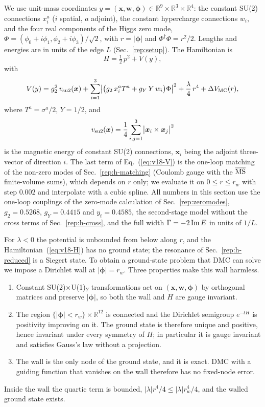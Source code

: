 We use unit-mass coordinates $y=(\bm x,\bm w,\bm\phi)\in\mathbb R^9\times\mathbb R^3\times\mathbb R^4$: the constant SU(2) connections $x_i^a$ ($i$ spatial, $a$ adjoint), the constant hypercharge connections $w_i$, and the four real components of the Higgs zero mode, $\Phi=(\phi_0+i\phi_1,\phi_2+i\phi_3)/\sqrt2$, with $r=|\bm\phi|$ and $\Phi^\dagger\Phi=r^2/2$.
Lengths and energies are in units of the edge $L$ (Sec.~\ref{rep:setup}).
The Hamiltonian is
\begin{equation}
H=\tfrac12\,p^2+V(y),
\label{eq:v18-H}
\end{equation}
with
\begin{equation}
V(y)=g_2^2\,v_{\rm su2}(\bm x)+\sum_{i=1}^3\bigl|\bigl(g_2\,x_i^aT^a+g_Y\,Y\,w_i\bigr)\Phi\bigr|^2+\frac{\lambda}{4}\,r^4+\Delta V_{\rm MC}(r),
\label{eq:v18-V}
\end{equation}
where $T^a=\sigma^a/2$, $Y=1/2$, and
\begin{equation}
v_{\rm su2}(\bm x)=\frac14\sum_{i,j=1}^{3}\bigl|\bm x_i\times\bm x_j\bigr|^2
\label{eq:v18-vsu2}
\end{equation}
is the magnetic energy of constant SU(2) connections, $\bm x_i$ being the adjoint three-vector of direction $i$.
The last term of Eq.~(\ref{eq:v18-V}) is the one-loop matching of the non-zero modes of Sec.~\ref{rep:h-matching} (Coulomb gauge with the $\overline{\mathrm{MS}}$ finite-volume sums), which depends on $r$ only; we evaluate it on $0\le r\le r_w$ with step $0.002$ and interpolate with a cubic spline.
All numbers in this section use the one-loop couplings of the zero-mode calculation of Sec.~\ref{rep:zeromodes}, $g_2=0.5268$, $g_Y=0.4415$ and $y_t=0.4585$, the second-stage model without the cross terms of Sec.~\ref{rep:h-cross}, and the full width $\Gamma=-2\,{\rm Im}\,E$ in units of $1/L$. %

For $\lambda<0$ the potential is unbounded from below along $r$, and the Hamiltonian~(\ref{eq:v18-H}) has no ground state; the resonance of Sec.~\ref{rep:h-reduced} is a Siegert state.
To obtain a ground-state problem that DMC can solve we impose a Dirichlet wall at $|\bm\phi|=r_w$.
Three properties make this wall harmless.
\begin{enumerate}
\item Constant SU(2)$\times$U(1)$_Y$ transformations act on $(\bm x,\bm w,\bm\phi)$ by orthogonal matrices and preserve $|\bm\phi|$, so both the wall and $H$ are gauge invariant.
\item The region $\{|\bm\phi|<r_w\}\times\mathbb R^{12}$ is connected and the Dirichlet semigroup $e^{-tH}$ is positivity improving on it.
The ground state is therefore unique and positive, hence invariant under every symmetry of $H$; in particular it is gauge invariant and satisfies Gauss's law without a projection.
\item The wall is the only node of the ground state, and it is exact.
DMC with a guiding function that vanishes on the wall therefore has no fixed-node error.
\end{enumerate}
Inside the wall the quartic term is bounded, $|\lambda| r^4/4\le|\lambda| r_w^4/4$, and the walled ground state exists.

